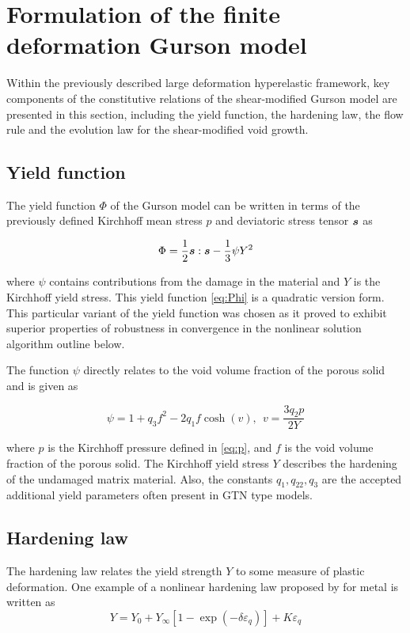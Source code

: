 \section{Formulation of the finite deformation Gurson model} \label{sec:formulation}

Within the previously described large deformation hyperelastic
framework, key components of the constitutive relations of the
shear-modified Gurson model are presented in this section, including
the yield function, the hardening law, the flow rule and the 
evolution law for the shear-modified void growth.

\subsection{Yield function}
The yield function $\Phi$ of the Gurson model can be written in terms
of the previously defined Kirchhoff mean stress $p$ and deviatoric
stress tensor ${\boldsymbol{s}}$ as

\begin{equation}\label{eq:Phi}
\Phi = \frac{1}{2}{\boldsymbol{s}}:{\boldsymbol{s}} - \frac{1}{3}\psi Y^2
\end{equation}

where $\psi$ contains contributions from the damage in the material
and $Y$ is the Kirchhoff yield stress. This yield function
\eqref{eq:Phi} is a quadratic version form. This particular variant 
of the yield function was chosen as it proved to exhibit superior
properties of robustness in convergence in the nonlinear solution
algorithm outline below.

The function $\psi$ directly relates to the void volume fraction of
the porous solid and is given as

\begin{equation}
\psi = 1 + q_3 f^2 - 2 q_1 f \cosh(v), ~~v=\frac{3 q_2 p}{2 Y}
\end{equation}

where $p$ is the Kirchhoff pressure defined in \eqref{eq:p}, and $f$
is the void volume fraction of the porous solid. The Kirchhoff yield
stress $Y$ describes the hardening of the undamaged matrix
material. Also, the constants $q_1,q_22,q_3$ are the accepted
additional yield parameters often present in GTN type models.

\subsection{Hardening law}
The hardening law relates the yield strength $Y$ to some measure of
plastic deformation. One example of a nonlinear hardening law proposed
by \cite{SimoHughes:98} for metal is written as
\begin{equation}
Y = Y_0 + Y_{\infty}\left[ 1-\exp(-\delta\varepsilon_q)\right] +
K\varepsilon_q
\end{equation}

